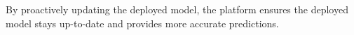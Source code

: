 By proactively updating the deployed model, the platform ensures the deployed model stays up-to-date and provides more accurate predictions.




%
%

